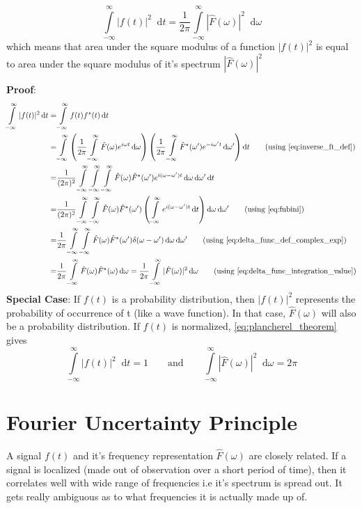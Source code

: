\documentclass[11pt, a4paper]{article}
\let\oldsection\section
\renewcommand{\section}{%
	\setcounter{equation}{0}%
	\oldsection%
}
\newcommand{\eqrefnp}[1]{\textup{\ref{#1}}}
\newcommand{\primed}[1]{#1^{\prime}}
\newcommand{\omegap}{\primed{\omega}}	%
\newcommand{\diff}{\mathop{}\!\mathrm{d}}
\newcommand{\dt}{\diff t}
\newcommand{\domega}{\diff \omega}
\newcommand{\domegap}{\diff \omegap}
\newcommand{\dint}[2]{\int \limits_{#1}^{#2}}  %
\newcommand{\intinfty}{\dint{-\infty}{\infty}}	%
\newcommand{\iintinfty}{\intinfty \intinfty}	%
\newcommand{\iiintinfty}{\intinfty \intinfty \intinfty}	%
\begin{document}
\begin{equation}\label{eq:plancherel_theorem}
	\intinfty |f(t)|^{2} \dt = \frac{1}{2 \pi} \intinfty |\hat{F}(\omega)|^{2} \domega
\end{equation}
which means that area under the square modulus of a function $|f(t)|^{2}$ is equal to area under the square modulus of it's spectrum $|\hat{F}(\omega)|^{2}$

\vspace{4pt}
\noindent
\textbf{Proof}: 
\begin{align*}
	\intinfty |f(t)|^{2} \dt 
	= & \intinfty f(t)f^{\star}(t) \dt \\
	= & \intinfty \left(\frac{1}{2 \pi} \intinfty \hat{F}(\omega) e^{i \omega t} \domega \right) \left(\frac{1}{2 \pi} \intinfty \hat{F}^{\star}(\omegap) e^{-i \omegap t} \domegap \right) \dt \tag{using \eqrefnp{eq:inverse_ft_def}} \\
	= & \frac{1}{(2 \pi)^2} \iiintinfty \hat{F}(\omega) \hat{F}^{\star}(\omegap) e^{i (\omega - \omegap) t} \domega \domegap \dt \\
	= & \frac{1}{(2 \pi)^2} \iintinfty \hat{F}(\omega) \hat{F}^{\star}(\omegap) \left( \intinfty e^{i (\omega - \omegap) t} \dt \right) \domega \domegap \tag{using \eqrefnp{eq:fubini}} \\
	= & \frac{1}{2 \pi} \iintinfty \hat{F}(\omega) \hat{F}^{\star}(\omegap) \delta(\omega - \omegap) \domega \domegap \tag{using \eqrefnp{eq:delta_func_def_complex_exp}} \\
	= & \frac{1}{2 \pi} \intinfty \hat{F}(\omega) \hat{F}^{\star}(\omega) \domega 
	= \frac{1}{2 \pi} \intinfty |\hat{F}(\omega)|^{2} \domega  \tag{using \eqrefnp{eq:delta_func_integration_value}} \\
\end{align*}
\noindent
\textbf{Special Case}: If $f(t)$ is a probability distribution, then $|f(t)|^{2}$ represents the probability of occurrence of t (like a wave function). In that case, $\hat{F}(\omega)$ will also be a probability distribution. If $f(t)$ is normalized, \eqref{eq:plancherel_theorem} gives
\begin{equation}\label{eq:plancherel_normal_func_and_spectrum}
	\intinfty |f(t)|^{2} \dt = 1 \qquad \text{and} \qquad \intinfty |\hat{F}(\omega)|^{2} \domega = 2 \pi
\end{equation}

\section{Fourier Uncertainty Principle}\label{sec:fourier_uncertainity_principle}
A signal $f(t)$ and it's frequency representation $\hat{F}(\omega)$ are closely related. If a signal is localized (made out of observation over a short period of time), then it correlates well with wide range of frequencies i.e it's spectrum is spread out. It gets really ambiguous as to what frequencies it is actually made up of.
\end{document}
